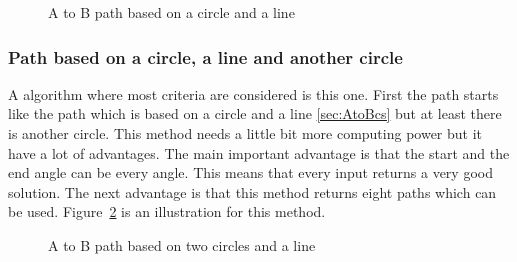 \begin{figure}

\caption{A to B path based on a circle and a line}
\label{fig:AtoBcs}
\end{figure}


\subsubsection{Path based on a circle, a line and another circle}
A algorithm where most criteria are considered is this one.
First the path starts like the path which is based on a circle and a line \ref{sec:AtoBcs} but at least there is another circle.
This method needs a little bit more computing power but it have a lot of advantages.
The main important advantage is that the start and the end angle can be every angle.
This means that every input returns a very good solution.
The next advantage is that this method returns eight paths which can be used.
Figure~\ref{fig:AtoBcsc} is an illustration for this method.

\begin{figure}

\caption{A to B path based on two circles and a line}
\label{fig:AtoBcsc}
\end{figure}
